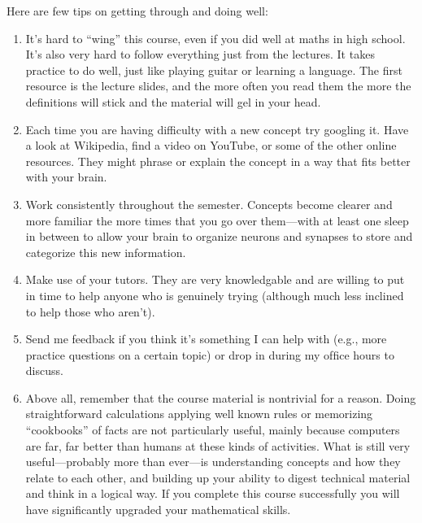 \documentclass[letterpaper,10pt,english]{jupyterBook}
\begin{document}
\sphinxAtStartPar
Here are few tips on getting through and doing well:
\begin{enumerate}
%
\item {} 
\sphinxAtStartPar
It’s hard to “wing” this course, even if you did well at maths in high school. It’s also very hard to follow everything just from the lectures.
It takes practice to do well, just like playing guitar or learning a language. The ﬁrst resource is the lecture slides, and the more often you read them the more the deﬁnitions will stick and the material will gel in your head.

\item {} 
\sphinxAtStartPar
Each time you are having difficulty with a new concept try googling it. Have a look at Wikipedia, find a video on YouTube, or some of the other online resources. They might phrase or explain the concept in a way that ﬁts better with your brain.

\item {} 
\sphinxAtStartPar
Work consistently throughout the semester. Concepts become clearer and more familiar the more times that you go over them—with at least one sleep in between to allow your brain to organize neurons and synapses to store and categorize this new information.

\item {} 
\sphinxAtStartPar
Make use of your tutors. They are very knowledgable and are willing to put in time to help anyone who is genuinely trying (although much less inclined to help those who aren’t).

\item {} 
\sphinxAtStartPar
Send me feedback if you think it’s something I can help with (e.g., more practice questions on a certain topic) or drop in during my ofﬁce hours to discuss.

\item {} 
\sphinxAtStartPar
Above all, remember that the course material is nontrivial for a reason. Doing straightforward calculations applying well known rules or memorizing “cookbooks” of facts are not particularly useful, mainly because computers are far, far better than humans at these kinds of activities. What is still very useful—probably more than ever—is understanding concepts and how they relate to each other, and building up your ability to digest technical material and think in a logical way.
If you complete this course successfully you will have signiﬁcantly upgraded your mathematical skills.

\end{enumerate}
\end{document}

